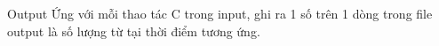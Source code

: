 Output
Ứng với mỗi thao tác C trong input, ghi ra 1 số trên 1 dòng trong file output là số lượng từ tại thời điểm tương ứng.
